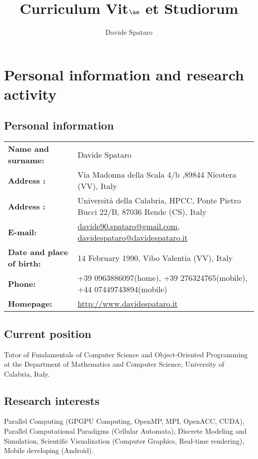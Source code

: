 \documentclass[a4paper,10pt]{article}
\title{Curriculum Vit$\ae$ et Studiorum}
\author{Davide Spataro}
\begin{document}
\maketitle

\tableofcontents

\newpage

\section{Personal information and research activity}

\subsection{Personal information}

\begin{table}[h]
\begin{tabular}{l l}
\textbf{Name and surname:} & Davide Spataro \\
\textbf{Address :} & Via Madonna della Scala 4/b ,89844 Nicotera (VV), Italy
\\
\textbf{Address :} & Universit\`a della Calabria, HPCC, Ponte Pietro Bucci
22/B, 87036 Rende (CS), Italy \\
\textbf{E-mail:} &
\href{mailto:davide90.spataro@gmail.com} {davide90.spataro@gmail.com},
\href{mailto:davidespataro@davidespataro.it.com}
{davidespataro@davidespataro.it}\\
\textbf{Date and place of birth:} & 14 February 1990, Vibo Valentia (VV),
Italy \\
\textbf{Phone: }& +39 0963886097(home), +39 276324765(mobile),
+44 07449743894(mobile) \\
\textbf{Homepage: }& \url{http://www.davidespataro.it} \\
\end{tabular}
\end{table}

\subsection{Current position}
Tutor of  Fundamentals of Computer Science and Object-Oriented Programming at 
the Department of Mathematics and Computer Science, University of Calabria,
Italy.

\subsection{Research interests}
Parallel Computing (GPGPU Computing, OpenMP, MPI, OpenACC, CUDA),
Parallel Computational Paradigms (Cellular Automata), Discrete Modeling and
Simulation, Scientific Visualization (Computer Graphics, Real-time rendering), Mobile developing (Android).
\end{document}
